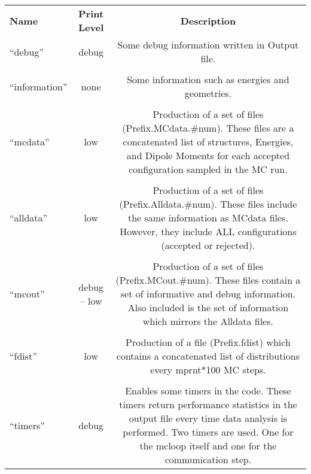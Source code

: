 \begin{table}[htbp!]
\begin{center}
\begin{tabular}{lcc}
  {\bf Name}          & {\bf Print Level} & {\bf Description} \\
``debug'' &      debug & \begin{minipage}{0.6\textwidth}Some debug
information written in Output
file.\end{minipage} \\
\\
``information'' & none & \begin{minipage}{0.6\textwidth}Some
information such as energies and
geometries.\end{minipage}\\
\\
``mcdata'' & low & \begin{minipage}{0.6\textwidth} Production of a
set of files (Prefix.MCdata.\#num). These files are a concatenated
list of structures, Energies, and Dipole Moments for each accepted
configuration sampled in the MC run.\end{minipage}\\
\\
``alldata'' & low & \begin{minipage}{0.6\textwidth}Production of a
set of files (Prefix.Alldata.\#num).  These files include the same
information as MCdata files.  However, they include ALL
configurations (accepted or
rejected).\end{minipage}\\
\\
``mcout'' & debug -- low  &
\begin{minipage}{0.6\textwidth}Production of a set of files
(Prefix.MCout.\#num).  These files contain a set of informative and
debug information.  Also included is the set of information which
mirrors the Alldata files.\end{minipage}\\
\\
``fdist'' & low & \begin{minipage}{0.6\textwidth}Production of a
file (Prefix.fdist) which contains
a concatenated list of distributions every mprnt*100 MC steps.\end{minipage}\\
\\
``timers'' & debug &
\begin{minipage}{0.6\textwidth}Enables some timers in the code.
These timers return performance statistics in the output file every
time data analysis is performed.  Two timers are used.  One for the
mcloop itself and one for the communication step.\end{minipage}
\end{tabular}
\end{center}
\end{table}

